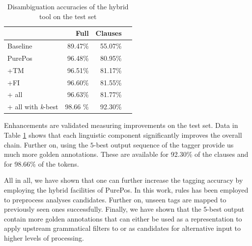 \begin{table}[H]
\centering
\caption{Disambiguation accuracies of the hybrid tool on the test set}
\label{tab:oldhun-test}
\begin{tabular}{l r r r}
\hline
 & Full & Clauses  \\
\hline
Baseline  & 89.47\% & 55.07\% \\
PurePos  & 96.48\% & 80.95\% \\
+TM  & 96.51\% & 81.17\% \\
+FI  & 96.60\% & 81.55\% \\
+ all  & 96.63\% & 81.77\% \\
+ all with \emph{k}-best  & 98.66 \% & 92.30\% \\
\hline
\end{tabular}
\end{table}
 
Enhancements are validated measuring improvements on the test set.
Data in Table \ref{tab:oldhun-test} shows that each linguistic component significantly improves the overall chain.
Further on, using the $5$-best output sequence of the tagger provide us much more golden annotations. 
These are available for 92.30\% of the clauses and for 98.66\% of the tokens.

All in all, we have shown that one can further increase the tagging accuracy by employing the hybrid facilities of PurePos. 
In this work, rules has been employed to preprocess analyses candidates. 
Further on, unseen tags are mapped to previously seen ones successfully. 
Finally, we have shown that the 5-best output contain more golden annotations that can either be used as a representation to apply upstream grammatical filters to or as candidates for alternative input to higher levels of processing.


